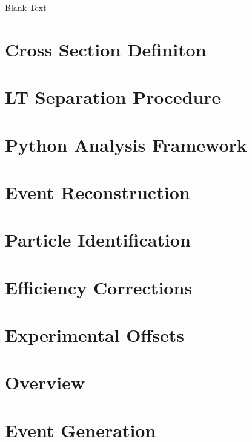 \documentclass[
]{report}
\begin{document}
Blank Text \label{Chapter-5}

\hypertarget{Section-5.1}{%
\section{Cross Section Definiton}\label{Section-5.1}}

\hypertarget{Section-5.2}{%
\section{LT Separation Procedure}\label{Section-5.2}}

\hypertarget{Section-5.3}{%
\section{Python Analysis Framework}\label{Section-5.3}}

\hypertarget{Section-5.4}{%
\section{Event Reconstruction}\label{Section-5.4}}

\hypertarget{Section-5.5}{%
\section{Particle Identification}\label{Section-5.5}}

\hypertarget{Section-5.6}{%
\section{Efficiency Corrections}\label{Section-5.6}}

\hypertarget{Section-5.7}{%
\section{Experimental Offsets}\label{Section-5.7}}

\label{Chapter-6}

\hypertarget{Section-6.1}{%
\section{Overview}\label{Section-6.1}}

\hypertarget{Section-6.2}{%
\section{Event Generation}\label{Section-6.2}}
\end{document}
